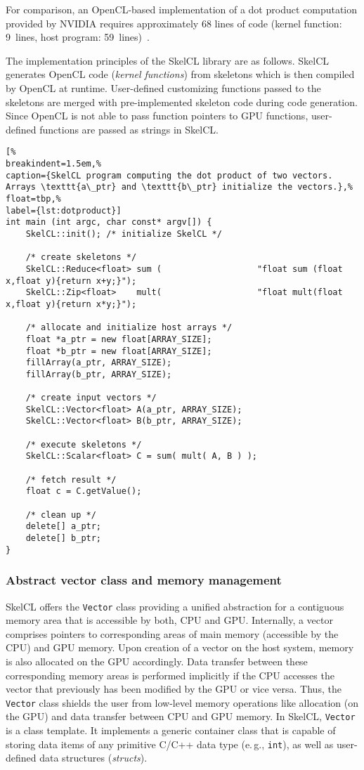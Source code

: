 For comparison, an OpenCL-based implementation of a dot product computation provided by NVIDIA requires approximately 68 lines of code (kernel function: 9~lines, host program: 59~lines)~\cite{CUDASDK-10}.

The implementation principles of the SkelCL library are as follows.
SkelCL generates OpenCL code (\emph{kernel functions}) from skeletons which is then compiled by OpenCL at runtime.
User-defined customizing functions passed to the skeletons are merged with pre-implemented skeleton code during code generation.
Since OpenCL is not able to pass function pointers to GPU functions, user-defined functions are passed as strings in SkelCL.

\begin{lstlisting}[%
breakindent=1.5em,%
caption={SkelCL program computing the dot product of two vectors. Arrays \texttt{a\_ptr} and \texttt{b\_ptr} initialize the vectors.},%
float=tbp,%
label={lst:dotproduct}]
int main (int argc, char const* argv[]) {
    SkelCL::init(); /* initialize SkelCL */

    /* create skeletons */
    SkelCL::Reduce<float> sum (                   "float sum (float x,float y){return x+y;}");
    SkelCL::Zip<float>    mult(                   "float mult(float x,float y){return x*y;}");

    /* allocate and initialize host arrays */
    float *a_ptr = new float[ARRAY_SIZE];
    float *b_ptr = new float[ARRAY_SIZE];
    fillArray(a_ptr, ARRAY_SIZE);
    fillArray(b_ptr, ARRAY_SIZE);

    /* create input vectors */
    SkelCL::Vector<float> A(a_ptr, ARRAY_SIZE);
    SkelCL::Vector<float> B(b_ptr, ARRAY_SIZE);

    /* execute skeletons */
    SkelCL::Scalar<float> C = sum( mult( A, B ) );

    /* fetch result */
    float c = C.getValue();
    
    /* clean up */
    delete[] a_ptr;
    delete[] b_ptr;
}
\end{lstlisting}

\subsubsection{Abstract vector class and memory management}

SkelCL offers the \texttt{Vector} class providing a unified abstraction for a contiguous memory area that is accessible by both, CPU and GPU.
Internally, a vector comprises pointers to corresponding areas of main memory (accessible by the CPU) and GPU memory.
Upon creation of a vector on the host system, memory is also allocated on the GPU accordingly.
Data transfer between these corresponding memory areas is performed implicitly if the CPU accesses the vector that previously has been modified by the GPU or vice versa.
Thus, the \texttt{Vector} class shields the user from low-level memory operations like allocation (on the GPU) and data transfer between CPU and GPU memory.
In SkelCL, \texttt{Vector} is a class template.
It implements a generic container class that is capable of storing data items of any primitive C/C++ data type (e.\,g., \texttt{int}), as well as user-defined data structures (\emph{structs}).


